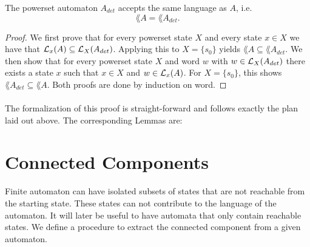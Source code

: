 \documentclass[11pt,a4paper,oneside]{book}
\begin{document}
                    \begin{theorem}
                        The powerset automaton $A_{det}$ accepts the same language as $A$, i.e.
                        \[
                            \lang{A} = \lang{A_{det}}.
                        \]
                    \end{theorem}

                    \begin{proof}
                        We first prove that for every powerset state $X$ and every state $x \in X$ we have that $\mathcal{L}_x(A) \subseteq \mathcal{L}_X(A_{det})$. 
                        Applying this to $X=\{s_0\}$ yields $\lang{A} \subseteq \lang{A_{det}}$.
                        We then show that for every powerset state $X$ and word $w$ with $w \in \mathcal{L}_X(A_{det})$ there exists a state $x$ such that $x \in X$ and $w \in \mathcal{L}_x(A)$. 
                        For $X = \{s_0\}$, this shows $\lang{A_{det}} \subseteq \lang{A}$.
                        Both proofs are done by induction on word.
                    \end{proof}

                    \paragraph{}
                        The formalization of this proof is straight-forward and follows exactly the plan laid out above. 
                        The corresponding Lemmas are:
                        \vspace{-0.4cm}
                        \vspace{-0.4cm}
                        

        \section{Connected Components}
            \paragraph{} 
                Finite automaton can have isolated subsets of states that are not reachable from the starting state. 
                These states can not contribute to the language of the automaton. 
                It will later be useful to have automata that only contain reachable states. 
                We define a procedure to extract the connected component from a given automaton.
\end{document}
